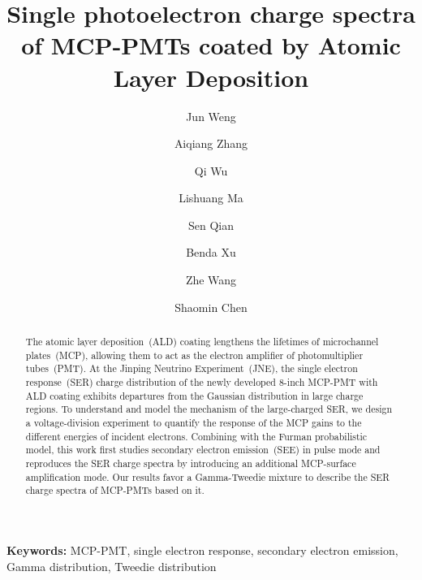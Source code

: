 \documentclass[preprint,review,12pt]{elsarticle}
\begin{document}
\begin{frontmatter}
    \title{Single photoelectron charge spectra of MCP-PMTs coated by Atomic Layer Deposition}
    \author[a,b,c]{Jun Weng}
    \author[a,b,c]{Aiqiang Zhang}
    \author[d]{Qi Wu}
    \author[d]{Lishuang Ma}
    \author[d]{Sen Qian}
    \author[a,b,c]{Benda Xu}%
    \author[a,b,c]{Zhe Wang}
    \author[a,b,c]{Shaomin Chen}

    \begin{abstract}
        The atomic layer deposition~(ALD) coating lengthens the lifetimes of microchannel plates~(MCP), allowing them to act
        as the electron amplifier of photomultiplier tubes~(PMT).
        At the Jinping Neutrino Experiment~(JNE), the single electron response~(SER) charge distribution of
        the newly developed 8-inch MCP-PMT with ALD coating exhibits departures from the Gaussian distribution in large charge regions.
        To understand and model the mechanism of the large-charged SER,
        we design a voltage-division experiment to quantify the response of the MCP gains to the different energies of incident electrons.
        Combining with the Furman probabilistic model,
        this work first studies secondary electron emission~(SEE) in pulse mode
        and reproduces the SER charge spectra by introducing an additional MCP-surface amplification mode.
        Our results favor a Gamma-Tweedie mixture to describe the SER charge spectra of MCP-PMTs based on it.
    \end{abstract}
\end{frontmatter}
\linenumbers
\textbf{Keywords:} MCP-PMT, single electron response, secondary electron emission, Gamma distribution, Tweedie distribution









\end{document}
